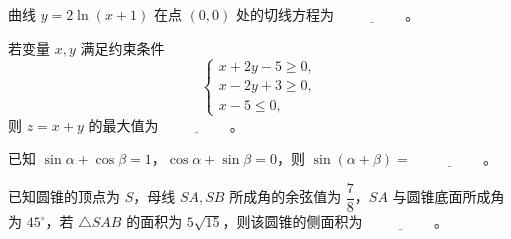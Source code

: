 \begin{question}
曲线 $y=2\ln(x+1)$ 在点 $(0,0)$ 处的切线方程为 $\underline{\hspace{2cm}}$。

\end{question}
\begin{question}
若变量 $x, y$ 满足约束条件
\nopagebreak[4]
\[\begin{cases} x+2y-5\geqslant 0, \\ x-2y+3\geqslant 0, \\ x-5\leqslant 0, \end{cases}\]
则 $z=x+y$ 的最大值为 $\underline{\hspace{2cm}}$。

\end{question}
\begin{question}
已知 $\sin\alpha+\cos\beta=1$，$\cos\alpha+\sin\beta=0$，则 $\sin(\alpha+\beta)=$ $\underline{\hspace{2cm}}$。

\end{question}
\begin{question}
已知圆锥的顶点为 $S$，母线 $SA, SB$ 所成角的余弦值为 $\dfrac78$，$SA$ 与圆锥底面所成角为 $45^\circ$，若 $\triangle SAB$ 的面积为 $5\sqrt{15}$，则该圆锥的侧面积为 $\underline{\hspace{2cm}}$。

\par\medskip

\end{question}


